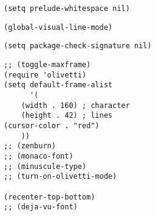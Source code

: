 \documentclass[11pt]{article}
\begin{document}
\begin{verbatim}
(setq prelude-whitespace nil)
\end{verbatim}
\label{sec:orgb70ea34}
\begin{verbatim}
(global-visual-line-mode)
\end{verbatim}
\label{sec:orgc9f9eeb}
\begin{verbatim}
(setq package-check-signature nil)
\end{verbatim}
\label{sec:orgfe00899}

\begin{verbatim}
;; (toggle-maxframe)
(require 'olivetti)
(setq default-frame-alist
      '(
	(width . 160) ; character
	(height . 42) ; lines
(cursor-color . "red") 
	))
;; (zenburn)
;; (monaco-font)
;; (minuscule-type)
;; (turn-on-olivetti-mode)

(recenter-top-bottom)
;; (deja-vu-font)

\end{verbatim}
\label{sec:orgfdfea2b}
\end{document}
